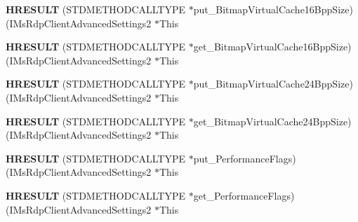 \begin{DoxyCompactItemize}
\mbox{\label{struct_i_ms_rdp_client_advanced_settings2_vtbl_aaad2b02768103ba351983180f8139921}} 
{\bfseries H\+R\+E\+S\+U\+LT} (S\+T\+D\+M\+E\+T\+H\+O\+D\+C\+A\+L\+L\+T\+Y\+PE $\ast$put\+\_\+\+Bitmap\+Virtual\+Cache16\+Bpp\+Size)(I\+Ms\+Rdp\+Client\+Advanced\+Settings2 $\ast$This
\item 
\mbox{\label{struct_i_ms_rdp_client_advanced_settings2_vtbl_a3a6d8b6e032e56c0f9f1d7b60e688c1d}} 
{\bfseries H\+R\+E\+S\+U\+LT} (S\+T\+D\+M\+E\+T\+H\+O\+D\+C\+A\+L\+L\+T\+Y\+PE $\ast$get\+\_\+\+Bitmap\+Virtual\+Cache16\+Bpp\+Size)(I\+Ms\+Rdp\+Client\+Advanced\+Settings2 $\ast$This
\item 
\mbox{\label{struct_i_ms_rdp_client_advanced_settings2_vtbl_a7984f81af2ea584553aa61c26a0feeb3}} 
{\bfseries H\+R\+E\+S\+U\+LT} (S\+T\+D\+M\+E\+T\+H\+O\+D\+C\+A\+L\+L\+T\+Y\+PE $\ast$put\+\_\+\+Bitmap\+Virtual\+Cache24\+Bpp\+Size)(I\+Ms\+Rdp\+Client\+Advanced\+Settings2 $\ast$This
\item 
\mbox{\label{struct_i_ms_rdp_client_advanced_settings2_vtbl_a4adbbdd9b9d97141fad26a3c06655156}} 
{\bfseries H\+R\+E\+S\+U\+LT} (S\+T\+D\+M\+E\+T\+H\+O\+D\+C\+A\+L\+L\+T\+Y\+PE $\ast$get\+\_\+\+Bitmap\+Virtual\+Cache24\+Bpp\+Size)(I\+Ms\+Rdp\+Client\+Advanced\+Settings2 $\ast$This
\item 
\mbox{\label{struct_i_ms_rdp_client_advanced_settings2_vtbl_a99959d173a0c2a5512e46c364d3403da}} 
{\bfseries H\+R\+E\+S\+U\+LT} (S\+T\+D\+M\+E\+T\+H\+O\+D\+C\+A\+L\+L\+T\+Y\+PE $\ast$put\+\_\+\+Performance\+Flags)(I\+Ms\+Rdp\+Client\+Advanced\+Settings2 $\ast$This
\item 
\mbox{\label{struct_i_ms_rdp_client_advanced_settings2_vtbl_a5dab500826fb3d7edb02986cd5958ca6}} 
{\bfseries H\+R\+E\+S\+U\+LT} (S\+T\+D\+M\+E\+T\+H\+O\+D\+C\+A\+L\+L\+T\+Y\+PE $\ast$get\+\_\+\+Performance\+Flags)(I\+Ms\+Rdp\+Client\+Advanced\+Settings2 $\ast$This
\item 
\mbox{\label{struct_i_ms_rdp_client_advanced_settings2_vtbl_a368165cea324aade10f6d2669e80984a}} 

\end{DoxyCompactItemize}
